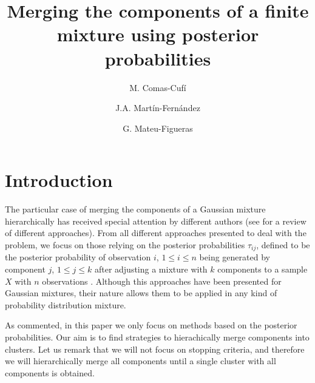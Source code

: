 \documentclass[10pt, a4paper]{article}
\title{Merging the components of a finite mixture using  posterior probabilities}
\author{M. Comas-Cufí \and J.A. Martín-Fernández \and G. Mateu-Figueras}
\newtheorem{prob}{Problem}
\begin{document}
\maketitle

\section{Introduction}

The particular case of merging the components of a Gaussian mixture hierarchically has received special attention by different authors (see\cite{hennig2010methods} for a review of different approaches). From all different approaches presented to deal with the problem, we focus on those relying on the posterior probabilities $\tau_{ij}$, defined to be the posterior probability of observation $i$, $1 \leq i \leq n$ being generated by component $j$, $1\leq j\leq k$ after adjusting a mixture with $k$ components  to a sample $X$ with $n$ observations \citep{melnykov2013distribution,hennig2010methods,baudry2010combining,ComasCufi2013}.  Although this approaches have been presented for Gaussian mixtures, their nature allows them to be applied in any kind of probability distribution mixture.



As commented, in this paper we only focus on methods based on the posterior probabilities. Our aim is to find strategies to hierachically merge components into clusters. Let us remark that we will not focus on stopping criteria, and therefore we will hierarchically merge all components until a single cluster with all components is obtained.




% 
%
\end{document}
